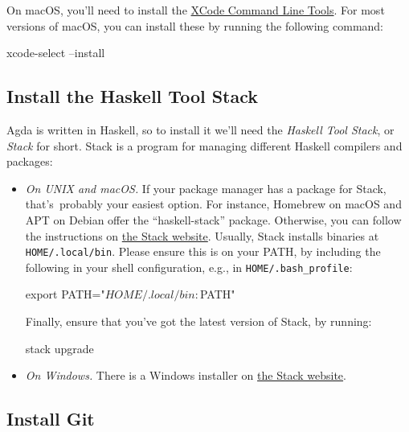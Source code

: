 On macOS, you'll need to install the
\href{https://developer.apple.com/xcode/}{XCode Command Line Tools}. For
most versions of macOS, you can install these by running the following
command:

\begin{myDisplay}
xcode-select --install
\end{myDisplay}

\hypertarget{install-the-haskell-tool-stack}{%
\subsection{Install the Haskell Tool
Stack}\label{install-the-haskell-tool-stack}}

Agda is written in Haskell, so to install it we'll need the
\emph{Haskell Tool Stack}, or \emph{Stack} for short. Stack is a program
for managing different Haskell compilers and packages:

\begin{itemize}
\item
  \emph{On UNIX and macOS.} If your package manager has a package for
  Stack, that's~probably your easiest option. For instance, Homebrew on
  macOS and APT on Debian offer the ``haskell-stack'' package.
  Otherwise, you can follow the instructions on
  \href{https://docs.haskellstack.org/en/stable/README/}{the Stack
  website}. Usually, Stack installs binaries at
  \texttt{HOME/.local/bin}. Please ensure this is on your PATH, by
  including the following in your shell configuration, e.g., in
  \texttt{HOME/.bash\_profile}:

  \begin{myDisplay}
  export PATH="${HOME}/.local/bin:${PATH}"
  \end{myDisplay}

  Finally, ensure that you've got the latest version of Stack, by
  running:

  \begin{myDisplay}
  stack upgrade
  \end{myDisplay}
\item
  \emph{On Windows.} There is a Windows installer on
  \href{https://docs.haskellstack.org/en/stable/README/}{the Stack
  website}.
\end{itemize}

\hypertarget{install-git}{%
\subsection{Install Git}\label{install-git}}

